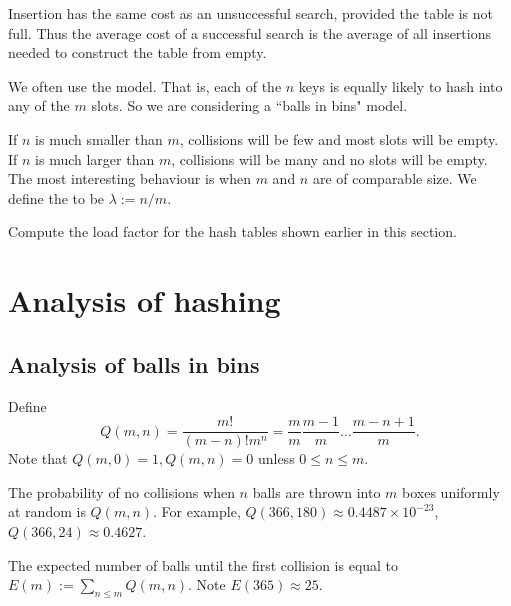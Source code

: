Insertion has the same cost as an unsuccessful search, provided the table is not full.
Thus the average cost of a successful search is the average of all insertions needed to construct the table from empty.

We often use the  model. 
That is, each of the $n$ keys is equally likely to hash into any of the $m$ slots. 
So we are considering a ``balls in bins" model.

If $n$ is much smaller than $m$, collisions will be few and most slots will be empty. 
If $n$ is much larger than $m$, collisions will be many and no slots will be empty. 
The most interesting behaviour is when $m$ and $n$ are of comparable size. 
We define the  to be $\lambda := n/m$. 

\begin{Boxample}[4]
Compute the load factor for the hash tables shown earlier in this section.
\end{Boxample}


\chapter{Analysis of hashing} %

\section{Analysis of balls in bins}
Define 
$$Q(m, n) = \frac{m!}{(m-n)! m^n} = \frac{m}{m} \frac{m-1}{m} \dots 
\frac{m - n + 1}{m}\text{.}$$
Note that $Q(m,0) = 1, Q(m, n) = 0$ unless $0 \leq n \leq m$.

The probability of no collisions when $n$ balls are thrown into $m$ boxes 
uniformly at random is $Q(m, n)$. For example, $Q(366, 180) \approx 0.4487
 \times 10^{-23}$, $Q(366, 24) \approx  0.4627$. 

The expected number of balls until the first collision is equal to 
$E(m):=\sum_{n \leq m} Q(m, n)$. Note $E(365) \approx 25$.



